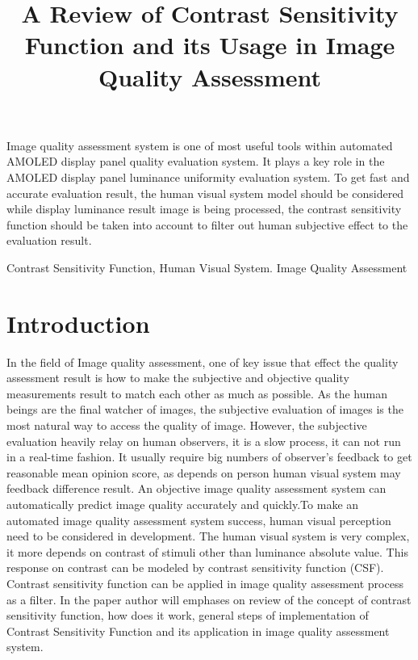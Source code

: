 \documentclass{article}
\title{A Review of Contrast Sensitivity Function and its Usage in Image Quality Assessment}
\begin{document}
%
\maketitle
%
\begin{abstract}

\end{abstract}
%
Image quality assessment system is one of most useful tools within automated AMOLED display panel quality evaluation system. It plays a key role in the AMOLED display panel luminance uniformity evaluation system. To get fast and accurate evaluation result, the human visual system model should be considered while display luminance result image is being processed, the contrast sensitivity function should be taken into account to filter out human subjective effect to the evaluation result.\\         

\begin{keywords}
Contrast Sensitivity Function, Human Visual System. Image Quality Assessment 
\end{keywords}
%
\section{Introduction}
\label{sec:intro}

In the field of Image quality assessment, one of key issue that effect the quality assessment result is how to make the subjective and objective quality measurements result to match each other as much as possible. As the human beings are the final watcher of images, the subjective evaluation of images is the most natural way to access the quality of image. However, the subjective evaluation heavily relay on human observers, it is a slow process, it can not run in a real-time fashion. It usually require big numbers of observer's feedback to get reasonable mean opinion score, as depends on person human visual system may feedback difference result. An objective image quality assessment system can automatically predict image quality accurately and  quickly.To make an automated image quality assessment system success, human visual perception need to be considered in development. The human visual system is very complex, it more depends on contrast of stimuli other than luminance absolute value. This response on contrast can be modeled by contrast sensitivity function (CSF). Contrast sensitivity function can be applied in image quality assessment process as a filter. In the paper author will emphases on review of the concept of contrast sensitivity function, how does it work, general steps of implementation of Contrast Sensitivity Function and its application in image quality assessment system. 
\end{document}
